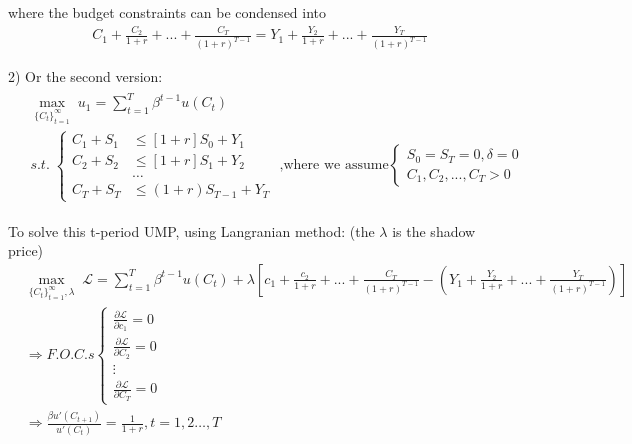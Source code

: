 \documentclass{article}
\begin{document}
where the budget constraints can be condensed into 
\begin{align}
C_{1}+\frac{C_{2}}{1+r}+...+\frac{C_{T}}{(1+r)^{T-1}}=Y_{1}+\frac{Y_{2}}{1+r}+...+\frac{Y_{T}}{(1+r)^{T-1}} 
\end{align}

2) Or the second version:
\begin{align}
\begin{split}
&\mathop{max}_{\{C_{t}\}^{\infty}_{t=1}} \; u_{1}=\sum\limits_{t=1}^{T}\beta^{t-1}u(C_{t})
\\&s.t. \; \begin{cases}
C_{1}+S_{1} &\leqslant [1+r]S_{0} +Y_{1} \\
C_{2}+S_{2} &\leqslant [1+r]S_{1}+Y_{2} \\
&\dots\\
C_{T}+S_{T}&\leqslant(1+r)S_{T-1}+Y_{T} \end{cases}\text{ ,where we assume}\begin{cases}
S_{0}=S_{T}=0, \delta=0 \\
C_{1},C_{2},...,C_{T}>0\end{cases} 
\end{split}
\end{align}

To solve this t-period UMP, using Langranian method: (the $\lambda$ is the shadow price)
\begin{align}
&\mathop{max}_{\{C_{t}\}^{\infty}_{t=1},\lambda} \; \mathscr{L}=\sum\limits_{t=1}^{T}\beta^{t-1}u(C_{t})+\lambda[c_{1}+\frac{c_{2}}{1+r}+...+\frac{C_{T}}{(1+r)^{T-1}}-(Y_{1}+\frac{Y_{2}}{1+r}+...+\frac{Y_{T}}{(1+r)^{T-1}}) ]
\\&\Rightarrow F.O.C.s \begin{cases}\frac{\partial  \mathscr{L}}{\partial  c_{1}}=0 \\
\frac{\partial  \mathscr{L}}{\partial  C_{2}}=0 \\
\vdots \\
\frac{\partial  \mathscr{L}}{\partial  C_{T}}=0
\end{cases} 
\\&\Rightarrow \frac{\beta u'(C_{t+1})}{u'(C_t)}=\frac{1}{1+r}, t=1,2\dots,T
\end{align}
\end{document}

